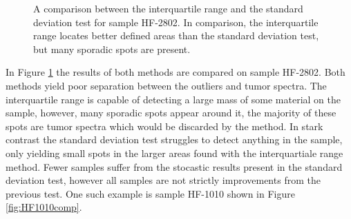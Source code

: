 \begin{figure}[h]

    \centering
    \qquad
    \caption{A comparison between the interquartile range and the standard deviation test for sample HF-2802. In comparison, the interquartile range locates better defined areas than the standard deviation test, but many sporadic spots are present.
\label{fig:HF2802comp}}%
\end{figure}
 

In Figure \ref{fig:HF2802comp} the results of both methods are compared on sample HF-2802. Both methods yield poor separation between the outliers and tumor spectra. The interquartile range is capable of detecting a large mass of some material on the sample, however, many sporadic spots appear around it, the majority of these spots are tumor spectra which would be discarded by the method. In stark contrast the standard deviation test struggles to detect anything in the sample, only yielding small spots in the larger areas found with the interquartiale range method.
Fewer samples suffer from the stocastic results present in the standard deviation test, however all samples are not strictly improvements from the previous test. One such example is sample HF-1010 shown in Figure \ref{fig:HF1010comp}.

